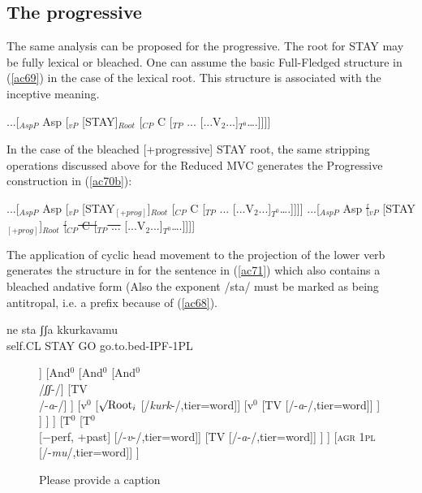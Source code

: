 \documentclass[output=paper]{langscibook}
\begin{document}
\subsection{The progressive}

The same analysis can be proposed for the progressive.  The root for STAY may be fully lexical or bleached. One can assume the basic Full-Fledged structure in (\ref{ac69}) in the case of the lexical root.  This structure is associated with the inceptive meaning.

\ea \label{ac69}...[$_{AspP}$ Asp [$_{vP}$ [STAY]$_{Root}$ [$_{CP}$ C [$_{TP}$ ... [...V$_2$...]$_{T^0}$….]]]]
\z

In the case of the bleached [+progressive] STAY root, the same stripping operations discussed above for the Reduced MVC generates the Progressive construction in (\ref{ac70b}):

\ea \label{ac70}
    \ea \label{ac70a}...[$_{AspP}$ Asp [$_{vP}$ [STAY$_{[+prog]}$]$_{Root}$ [$_{CP}$ C [$_{TP}$ ... [...V$_2$...]$_{T^0}$….]]]]
    \ex \label{ac70b}...[$_{AspP}$ Asp \sout{[$_{vP}$} [STAY$_{[+prog]}$]$_{Root}$ \sout{[$_{CP}$ C [$_{TP}$ ...} [...V$_2$...]$_{T^0}$….]]]]
    \z
\z

The application of cyclic head movement to the projection of the lower verb generates the structure in  for the sentence in (\ref{ac71}) which also contains a bleached andative form (Also the exponent /sta/ must be marked as being antitropal, i.e. a prefix because of (\ref{ac68}). 

\ea \label{ac71}
    \gll ne     sta    ʃʃa  kkurkavamu\\
   self.CL STAY GO  go.to.bed-IPF-1PL\\
\z

\begin{figure}
  \caption{\label{ac72}\color{red}Please provide a caption}
  \begin{forest}
  	[T$^0$
  		[T$^0$
	  		[$\surd{} + \text{prog}$
	  			[$\surd{} + \text{prog}$
	  				[$\surd{} + \text{prog}$\\/\textit{st}-/]
	  				[TV\\/-\textit{a}-/]
	  			]
	  			[And$^0$
	  				[And$^0$
	  					[And$^0$\\/\textit{ʃʃ}-/]
	  					[TV\\/-\textit{a}-/]
	  				]
	  				[v$^0$
	  					[$\surd\text{Root}_i$ [/\textit{kurk}-/,tier=word]]
	  					[v$^0$
	  						[TV [/-\textit{a}-/,tier=word]]
	  					]
	  				]
	  			]
	  		]
	  		[T$^0$
	  			[T$^0$\\{[−perf, +past]} [/-\textit{v}-/,tier=word]]
	  			[TV [/-\textit{a}-/,tier=word]]
	  		]
  		]
  		[\textsc{agr 1pl} [/-\textit{mu}/,tier=word]]
  	]
  \end{forest}
\end{figure}
\end{document}

